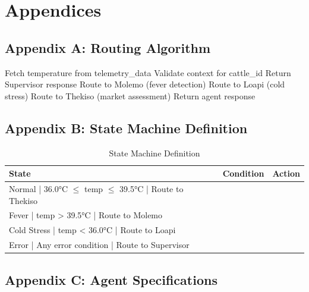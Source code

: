 
\chapter*{Appendices}

\section*{Appendix A: Routing Algorithm}

\begin{algorithm}
\caption{Telemetry Routing Algorithm}
\begin{algorithmic}[1]
\State Fetch temperature from telemetry\_data
\State Validate context for cattle\_id
    \State Return Supervisor response
\EndIf
{}
    \State Route to Molemo (fever detection)
    \State Route to Loapi (cold stress)
\Else
    \State Route to Thekiso (market assessment)
\EndIf
\State Return agent response
\end{algorithmic}
\end{algorithm}

\section*{Appendix B: State Machine Definition}

\begin{table}[H]
\centering
\begin{tabular}{|l|l|l|}
\hline
\textbf{State} & \textbf{Condition} & \textbf{Action} \\
\hline
Normal | 36.0°C $\leq$ temp $\leq$ 39.5°C | Route to Thekiso \\
Fever | temp > 39.5°C | Route to Molemo \\
Cold Stress | temp < 36.0°C | Route to Loapi \\
Error | Any error condition | Route to Supervisor \\
\hline
\end{tabular}
\caption{State Machine Definition}
\end{table}

\section*{Appendix C: Agent Specifications}

